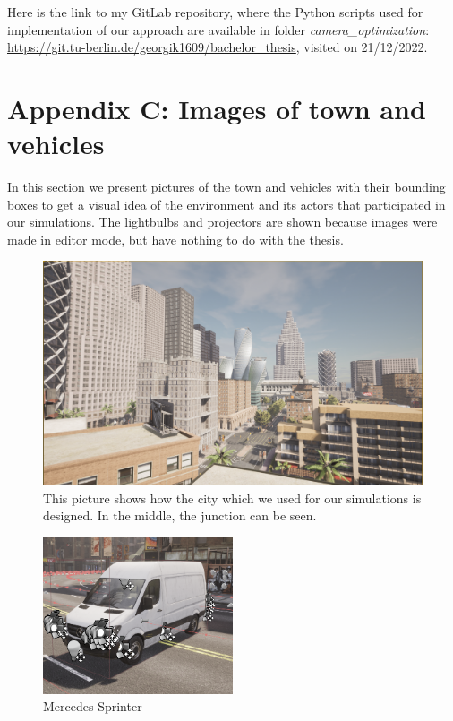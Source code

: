 Here is the link to my GitLab repository, where the Python scripts used for implementation of our approach are available in folder \textit{camera\_optimization}: \url{https://git.tu-berlin.de/georgik1609/bachelor_thesis}, visited on 21/12/2022.

\newpage
{}
\section*{Appendix C: Images of town and vehicles}
In this section we present pictures of the town and vehicles with their bounding boxes to get a visual idea of the environment and its actors that participated in our simulations. The lightbulbs and projectors are shown because images were made in editor mode, but have nothing to do with the thesis.
\begin{figure} [h!]
    \centering
    \includegraphics[width=\textwidth]{images/experiment_city.png}
    \caption[Environment for experiments]{This picture shows how the city which we used for our simulations is designed. In the middle, the junction can be seen.}
    \label{fig:city_experiments}
\end{figure}

\newpage
\begin{figure} [h!]
    \centering
    \includegraphics[width=0.5\textwidth]{images/mercedes_sprinter.png}
    \caption[Mercedes Sprinter]{Mercedes Sprinter}
    \label{fig:mercedes_sprinter}
\end{figure}

